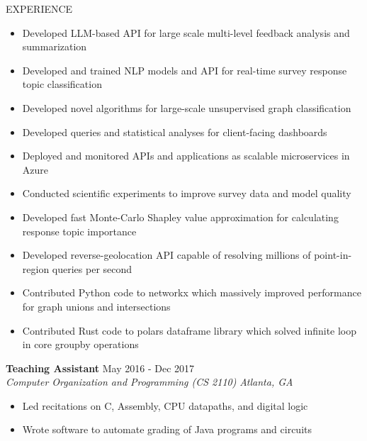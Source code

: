 \documentclass{resume} %
\begin{document}
\begin{rSection}{EXPERIENCE}
        \begin{itemize}
            \itemsep -6pt {}
            \item Developed LLM-based API for large scale multi-level feedback analysis and summarization
            \item Developed and trained NLP models and API for real-time survey response topic classification
        	\item Developed novel algorithms for large-scale unsupervised graph classification
        	\item Developed queries and statistical analyses for client-facing dashboards
        	\item Deployed and monitored APIs and applications as scalable microservices in Azure
        	\item Conducted scientific experiments to improve survey data and model quality
            \item Developed fast Monte-Carlo Shapley value approximation for calculating response topic importance
            \item Developed reverse-geolocation API capable of resolving millions of point-in-region queries per second
            \item Contributed Python code to networkx which massively improved performance for graph unions and intersections
            \item Contributed Rust code to polars dataframe library which solved infinite loop in core groupby operations
        \end{itemize}
     
        \textbf{Teaching Assistant} \hfill May 2016 - Dec 2017\\
        \textit{Computer Organization and Programming (CS 2110)} \hfill \textit{Atlanta, GA}
        \begin{itemize}
            \itemsep -6pt {} 
            \item Led recitations on C, Assembly, CPU datapaths, and digital logic
            \item Wrote software to automate grading of Java programs and circuits 
        \end{itemize}
    \end{rSection} 
    
\end{document}
